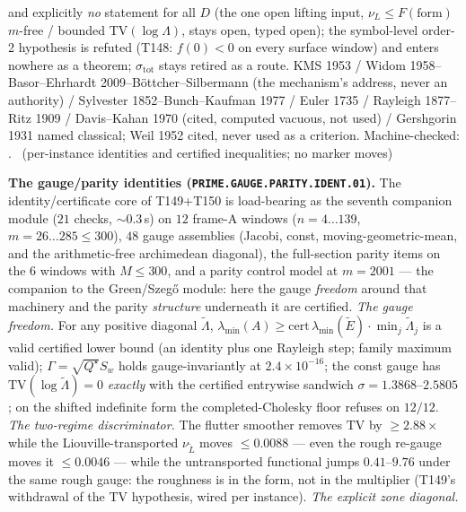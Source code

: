 and explicitly \emph{no} statement for all $D$ (the one open lifting input,
$\nu_L\le F(\text{form})$ $m$-free / bounded $\mathrm{TV}(\log\Lambda)$,
stays open, typed open); the symbol-level order-2 hypothesis is refuted
(T148: $f(0)<0$ on every surface window) and enters nowhere as a theorem;
$\sigma_{\mathrm{tot}}$ stays retired as a route.
KMS 1953 / Widom 1958--Basor--Ehrhardt 2009--B\"ottcher--Silbermann (the
mechanism's address, never an authority) / Sylvester 1852--Bunch--Kaufman
1977 / Euler 1735 / Rayleigh 1877--Ritz 1909 / Davis--Kahan 1970 (cited,
computed vacuous, not used) / Gershgorin 1931 named classical; Weil 1952
cited, never used as a criterion.
Machine-checked:
.
\mE\ (per-instance identities and certified inequalities; no marker moves)


\par\smallskip\noindent\textbf{The gauge/parity identities
(\texttt{PRIME.GAUGE.PARITY.IDENT.01}).}
The identity/certificate core of T149+T150 is load-bearing as the seventh
companion module ($21$ checks, ${\sim}0.3$\,s) on $12$ frame-A windows
($n=4\ldots139$, $m=26\ldots285\le300$), $48$ gauge assemblies (Jacobi,
const, moving-geometric-mean, and the arithmetic-free archimedean diagonal),
the full-section parity items on the $6$ windows with $M\le300$, and a
parity control model at $m=2001$ --- the companion to the Green/Szeg\H{o}
module: here the gauge \emph{freedom} around that machinery and the parity
\emph{structure} underneath it are certified.
\emph{The gauge freedom.} For any positive diagonal $\tilde\Lambda$,
$\lambda_{\min}(A)\ge\mathrm{cert}\,\lambda_{\min}(\tilde E)\cdot
\min_j\tilde\Lambda_j$ is a valid certified lower bound (an identity plus
one Rayleigh step; family maximum valid); $\Gamma=\sqrt{Q^\star}S_w$ holds
gauge-invariantly at $2.4\times10^{-16}$; the const gauge has
$\mathrm{TV}(\log\tilde\Lambda)=0$ \emph{exactly} with the certified
entrywise sandwich $\sigma=1.3868$--$2.5805$; on the shifted indefinite
form the completed-Cholesky floor refuses on $12/12$.
\emph{The two-regime discriminator.} The flutter smoother removes
$\mathrm{TV}$ by $\ge2.88\times$ while the Liouville-transported
$\nu_{\tilde L}$ moves $\le0.0088$ --- even the rough re-gauge moves it
$\le0.0046$ --- while the untransported functional jumps $0.41$--$9.76$
under the same rough gauge: the roughness is in the form, not in the
multiplier (T149's withdrawal of the TV hypothesis, wired per instance).
\emph{The explicit zone diagonal.}
